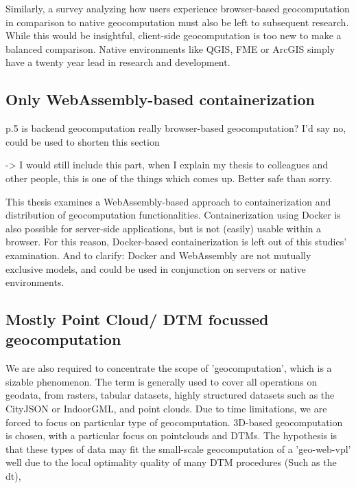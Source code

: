 Similarly, a survey analyzing how users experience browser-based geocomputation in comparison to native geocomputation must also be left to subsequent research. While this would be insightful, client-side geocomputation is too new to make a balanced comparison. Native environments like QGIS, FME or ArcGIS simply have a twenty year lead in research and development. 




\subsection*{Only WebAssembly-based containerization}

\begin{note}
  p.5 is backend geocomputation really browser-based geocomputation? I'd say no, could be used to shorten this section

  -> I would still include this part, when I explain my thesis to colleagues and other people, this is one of the things which comes up. Better safe than sorry.
\end{note}

This thesis examines a WebAssembly-based approach to containerization and distribution of geocomputation functionalities. 
Containerization using Docker is also possible for server-side applications, but is not (easily) usable within a browser. 
For this reason, Docker-based containerization is left out of this studies' examination. 
And to clarify: Docker and WebAssembly are not mutually exclusive models, and could be used in conjunction on servers or native environments. 

\subsection*{Mostly Point Cloud/ DTM focussed geocomputation}
We are also required to concentrate the scope of 'geocomputation', which is a sizable phenomenon.
The term is generally used to cover all operations on geodata, from rasters, tabular datasets, highly structured datasets such as the CityJSON or IndoorGML, and point clouds. 
Due to time limitations, we are forced to focus on particular type of geocomputation.
3D-based geocomputation is chosen, with a particular focus on pointclouds and DTMs. 
The hypothesis is that these types of data may fit the small-scale geocomputation of a 'geo-web-vpl' well due to the local optimality quality of many DTM procedures (Such as the \ac{dt}), 

